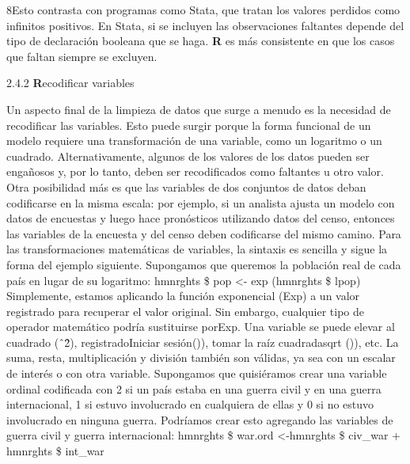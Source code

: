 \documentclass[
]{book}
\begin{document}
8Esto contrasta con programas como Stata, que tratan los valores perdidos como infinitos positivos. En Stata, si se incluyen las observaciones faltantes depende del tipo de declaración booleana que se haga.
\textbf{R} es más consistente en que los casos que faltan siempre se excluyen.

2.4.2 \textbf{R}ecodificar variables

Un aspecto final de la limpieza de datos que surge a menudo es la necesidad de recodificar las variables. Esto puede surgir porque la forma funcional de un modelo requiere una transformación de una variable, como un logaritmo o un cuadrado. Alternativamente, algunos de los valores de los datos pueden ser engañosos y, por lo tanto, deben ser recodificados como faltantes u otro valor. Otra posibilidad más es que las variables de dos conjuntos de datos deban codificarse en la misma escala: por ejemplo, si un analista ajusta un modelo con datos de encuestas y luego hace pronósticos utilizando datos del censo, entonces las variables de la encuesta y del censo deben codificarse del mismo camino.
Para las transformaciones matemáticas de variables, la sintaxis es sencilla y sigue la
forma del ejemplo siguiente. Supongamos que queremos la población real de cada país en lugar de su logaritmo:
hmnrghts \$ pop \textless- exp (hmnrghts \$ lpop)
Simplemente, estamos aplicando la función exponencial (Exp) a un valor registrado para recuperar el valor original. Sin embargo, cualquier tipo de operador matemático podría sustituirse porExp. Una variable se puede elevar al cuadrado (ˆ2̂), registradoIniciar sesión()), tomar la raíz cuadradasqrt ()), etc. La suma, resta, multiplicación y división también son válidas, ya sea con un escalar de interés o con otra variable. Supongamos que quisiéramos crear una variable ordinal codificada con 2 si un país estaba en una guerra civil y en una guerra internacional, 1 si estuvo involucrado en cualquiera de ellas y 0 si no estuvo involucrado en ninguna guerra. Podríamos crear esto agregando las variables de guerra civil y guerra internacional:
hmnrghts \$ war.ord \textless-hmnrghts \$ civ\_war + hmnrghts \$ int\_war
\end{document}
